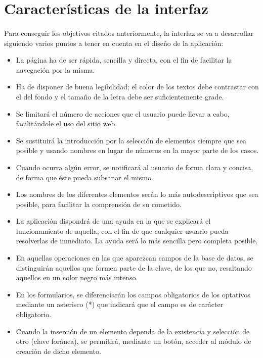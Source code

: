 \section{Características de la interfaz}

  \paragraph{}Para conseguir los objetivos citados anteriormente, la interfaz se
  va a desarrollar siguiendo varios puntos a tener en cuenta en el diseño de la
  aplicación:

  \begin{itemize}
   \item La página ha de ser rápida, sencilla y directa, con el fin de facilitar
   la navegación por la misma.
   \item Ha de disponer de buena legibilidad; el color de los textos debe
   contrastar con el del fondo y el tamaño de la letra debe ser suficientemente
   grade.
   \item Se limitará el número de acciones que el usuario puede llevar a cabo,
   facilitándole el uso del sitio web.
   \item Se sustituirá la introducción por la selección de elementos siempre
   que sea posible y usando nombres en lugar de números en la mayor parte de
   los casos.
   \item Cuando ocurra algún error, se notificará al usuario de forma clara y
   concisa, de forma que éste pueda subsanar el mismo.
   \item Los nombres de los diferentes elementos serán lo más autodescriptivos
   que sea posible, para facilitar la comprensión de su cometido.
   \item La aplicación dispondrá de una ayuda en la que se explicará el
   funcionamiento de aquella, con el fin de que cualquier usuario pueda
   resolverlas de inmediato. La ayuda será lo más sencilla pero completa
   posible.
   \item En aquellas operaciones en las que aparezcan campos de la base de
   datos, se distinguirán aquellos que formen parte de la clave, de los que no,
   resaltando aquellos en un color negro más intenso.
   \item En los formularios, se diferenciarán los campos obligatorios de los
   optativos mediante un asterisco (*) que indicará que el campo es de carácter
   obligatorio.
   \item Cuando la inserción de un elemento dependa de la existencia y selección
   de otro (clave foránea), se permitirá, mediante un botón, acceder al módulo
   de creación de dicho elemento.
  \end{itemize}
